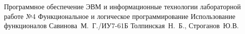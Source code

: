 \documentclass{bmstu}
\begin{document}
	
	{Программное обеспечение ЭВМ и информационные технологии}
	{лабораторной работе №4}
	{Функциональное и логическое программирование}
	{Использование функционалов}
	{}
	{Савинова~М.~Г./ИУ7-61Б}
	{Толпинская~Н.~Б., Строганов~Ю.В.}
	
	\maketableofcontents
	
	
	
	
\end{document}
